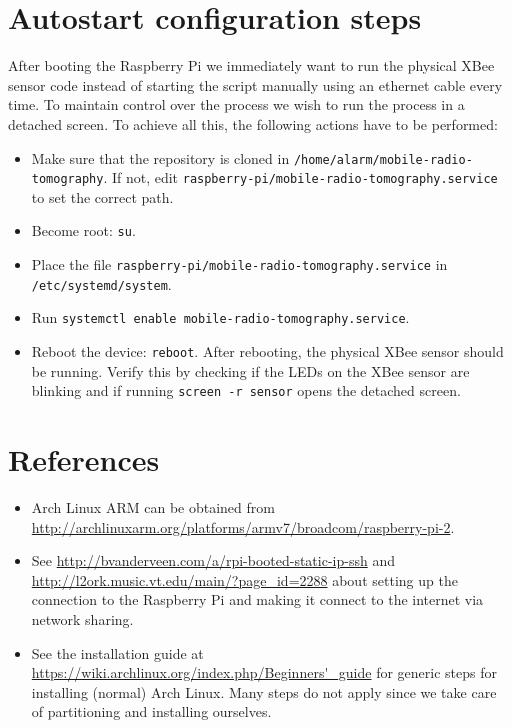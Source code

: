 \documentclass{article}
\begin{document}
\section{Autostart configuration steps}
After booting the Raspberry Pi we immediately want to run the physical XBee
sensor code instead of starting the script manually using an ethernet cable
every time. To maintain control over the process we wish to run the process
in a detached screen. To achieve all this, the following actions have to be
performed:

\begin{itemize}
    \item Make sure that the repository is cloned in
          {\tt /home/alarm/mobile-radio-tomography}. If not, edit
          {\tt raspberry-pi/mobile-radio-tomography.service} to set the
          correct path.
    \item Become root: {\tt su}.
    \item Place the file {\tt raspberry-pi/mobile-radio-tomography.service} in
          {\tt /etc/systemd/system}.
    \item Run {\tt systemctl enable mobile-radio-tomography.service}.
    \item Reboot the device: {\tt reboot}. After rebooting, the physical
          XBee sensor should be running. Verify this by checking if the LEDs on
          the XBee sensor are blinking and if running {\tt screen -r sensor}
          opens the detached screen.
\end{itemize}

\section{References}
\begin{itemize}
    \item Arch Linux ARM can be obtained from \url{http://archlinuxarm.org/platforms/armv7/broadcom/raspberry-pi-2}.
    \item See \url{http://bvanderveen.com/a/rpi-booted-static-ip-ssh} and 
          \url{http://l2ork.music.vt.edu/main/?page_id=2288} about setting up 
          the connection to the Raspberry Pi and making it connect to the 
          internet via network sharing.
    \item See the installation guide at 
          \url{https://wiki.archlinux.org/index.php/Beginners'_guide} for 
          generic steps for installing (normal) Arch Linux. Many steps do not 
          apply since we take care of partitioning and installing ourselves.
\end{itemize}
\end{document}
